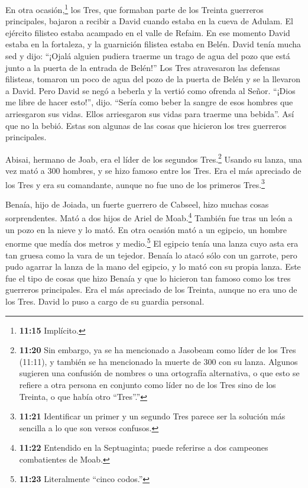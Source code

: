  En otra ocasión,\footnote{\textbf{11:15} Implícito.} los
Tres, que formaban parte de los Treinta guerreros principales, bajaron a
recibir a David cuando estaba en la cueva de Adulam. El ejército
filisteo estaba acampado en el valle de Refaim.  En ese
momento David estaba en la fortaleza, y la guarnición filistea estaba en
Belén.  David tenía mucha sed y dijo: ``¡Ojalá alguien
pudiera traerme un trago de agua del pozo que está junto a la puerta de
la entrada de Belén!''  Los Tres atravesaron las defensas
filisteas, tomaron un poco de agua del pozo de la puerta de Belén y se
la llevaron a David. Pero David se negó a beberla y la vertió como
ofrenda al Señor.  ``¡Dios me libre de hacer esto!'', dijo.
``Sería como beber la sangre de esos hombres que arriesgaron sus vidas.
Ellos arriesgaron sus vidas para traerme una bebida''. Así que no la
bebió. Estas son algunas de las cosas que hicieron los tres guerreros
principales.

 Abisai, hermano de Joab, era el líder de los segundos
Tres.\footnote{\textbf{11:20} Sin embargo, ya se ha mencionado a
  Jasobeam como líder de los Tres (11:11), y también se ha mencionado la
  muerte de 300 con su lanza. Algunos sugieren una confusión de nombres
  o una ortografía alternativa, o que esto se refiere a otra persona en
  conjunto como líder no de los Tres sino de los Treinta, o que había
  otro ``Tres''.''} Usando su lanza, una vez mató a 300 hombres, y se
hizo famoso entre los Tres.  Era el más apreciado de los
Tres y era su comandante, aunque no fue uno de los primeros
Tres.\footnote{\textbf{11:21} Identificar un primer y un segundo Tres
  parece ser la solución más sencilla a lo que son versos confusos.}

 Benaía, hijo de Joiada, un fuerte guerrero de Cabseel,
hizo muchas cosas sorprendentes. Mató a dos hijos de Ariel de
Moab.\footnote{\textbf{11:22} Entendido en la Septuaginta; puede
  referirse a dos campeones combatientes de Moab.} También fue tras un
león a un pozo en la nieve y lo mató.  En otra ocasión mató
a un egipcio, un hombre enorme que medía dos metros y medio.\footnote{\textbf{11:23}
  Literalmente ``cinco codos.''} El egipcio tenía una lanza cuyo asta
era tan gruesa como la vara de un tejedor. Benaía lo atacó sólo con un
garrote, pero pudo agarrar la lanza de la mano del egipcio, y lo mató
con su propia lanza.  Este fue el tipo de cosas que hizo
Benaía y que lo hicieron tan famoso como los tres guerreros principales.
 Era el más apreciado de los Treinta, aunque no era uno de
los Tres. David lo puso a cargo de su guardia personal.

